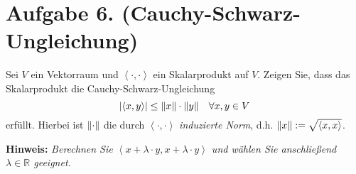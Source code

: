 \documentclass[german,12pt]{homework}
\newcommand{\RR}{\mathbb{R}}
\newcommand{\dotproduct}[2]{\left\langle#1, #2\right\rangle}
\DeclarePairedDelimiter{\absolute}{\lvert}{\rvert}
\DeclarePairedDelimiter{\norm}{\lVert}{\rVert}
\begin{document}
    \section*{Aufgabe 6. (Cauchy-Schwarz-Ungleichung)}

    \begin{problem}
        Sei \(V\) ein Vektorraum und \(\dotproduct{\cdot}{\cdot}\) ein Skalarprodukt auf \(V\). Zeigen Sie, dass das Skalarprodukt die Cauchy-Schwarz-Ungleichung
        \[\absolute*{\dotproduct{x}{y}} \le \norm*{x} \cdot \norm*{y} \quad {\forall}x, y \in V\]
        erfüllt. Hierbei ist \(\norm*{\cdot}\) die durch \(\dotproduct{\cdot}{\cdot}\) \emph{induzierte Norm}, d.h. \(\norm*{x} := \sqrt{\dotproduct{x}{x}}\).

        \textbf{Hinweis:} \quad \emph{Berechnen Sie \(\dotproduct{x + \lambda \cdot y}{x + \lambda \cdot y}\) und wählen Sie anschließend \(\lambda \in \RR\) geeignet.}
    \end{problem}
\end{document}
